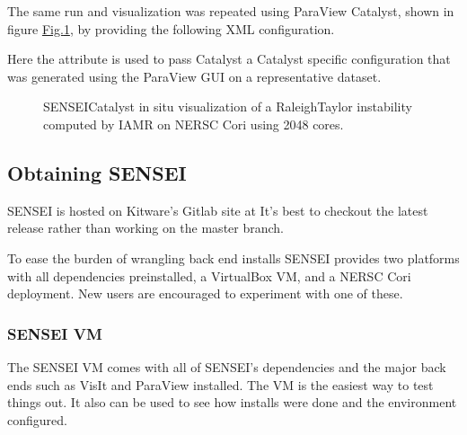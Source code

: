 \documentclass[letterpaper,10pt,english]{sphinxmanual}
\begin{document}
\sphinxAtStartPar
The same run and visualization was repeated using ParaView Catalyst, shown in
figure \hyperref[\detokenize{Visualization:rt-pv}]{Fig.\@ \ref{\detokenize{Visualization:rt-pv}}}, by providing the following XML configuration.

\begin{sphinxVerbatim}[commandchars=\\\{\}]
    
      
\end{sphinxVerbatim}

\sphinxAtStartPar
Here the  attribute is used to pass Catalyst a Catalyst specific
configuration that was generated using the ParaView GUI on a representative
dataset.

\begin{figure}[htbp]
\centering
\capstart

\noindent{}
\caption{SENSEI\sphinxhyphen{}Catalyst in situ visualization of a Raleigh\sphinxhyphen{}Taylor instability
computed by IAMR on NERSC Cori using 2048 cores.}\label{\detokenize{Visualization:id12}}\label{\detokenize{Visualization:rt-pv}}\end{figure}


\subsection{Obtaining SENSEI}
\label{\detokenize{Visualization:obtaining-sensei}}
\sphinxAtStartPar
SENSEI is hosted on Kitware’s Gitlab site at 
It’s best to checkout the latest release rather than working on the master branch.

\sphinxAtStartPar
To ease the burden of wrangling back end installs SENSEI provides two platforms
with all dependencies pre\sphinxhyphen{}installed, a VirtualBox VM, and a NERSC Cori
deployment. New users are encouraged to experiment with one of these.


\subsubsection{SENSEI VM}
\label{\detokenize{Visualization:sensei-vm}}
\sphinxAtStartPar
The SENSEI VM comes with all of SENSEI’s dependencies and the major back ends
such as VisIt and ParaView installed. The VM is the easiest way to test things
out. It also can be used to see how installs were done and the environment
configured.
\end{document}
